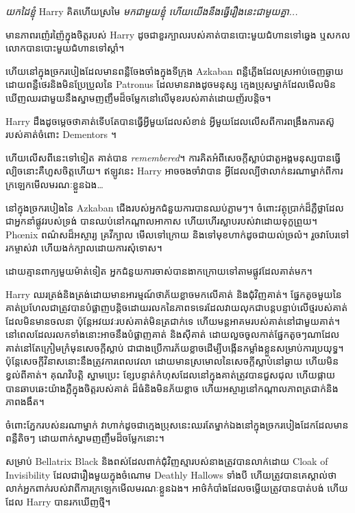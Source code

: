 {{\emph{យកដៃខ្ញុំ} Harry គិតហើយស្រមៃ \emph{មកជាមួយខ្ញុំ ហើយយើងនឹងធ្វើរឿងនេះជាមួយគ្នា...}

មាន​ភាព​រញ៉េរញ៉ៃ​ក្នុង​ចិត្ត​របស់ Harry ដូចជា​ខួរក្បាល​របស់​គាត់​បាន​បោះ​មួយ​ជំហាន​ទៅ​ឆ្វេង ឬ​សកលលោក​បាន​បោះ​មួយ​ជំហាន​ទៅ​ស្តាំ។

ហើយនៅក្នុងច្រករបៀងដែលមានពន្លឺចែងចាំងក្នុងទីក្រុង Azkaban ពន្លឺភ្លើងដែលស្រអាប់ចេញឆ្ងាយដោយពន្លឺថេរនិងមិនប្រែប្រួលនៃ Patronus ដែលមានរាងដូចមនុស្ស ក្មេងប្រុសម្នាក់ដែលមើលមិនឃើញឈរជាមួយនឹងស្នាមញញឹមដ៏ចម្លែកនៅលើមុខរបស់គាត់ដោយញ័របន្តិច។

Harry ដឹងដូចម្ដេចថាគាត់ទើបតែបានធ្វើអ្វីមួយដែលសំខាន់ អ្វីមួយដែលលើសពីការពង្រឹងការតស៊ូរបស់គាត់ចំពោះ Dementors ។

ហើយលើសពីនេះទៅទៀត គាត់បាន \emph{remembered}។ ការ​គិត​អំពី​សេចក្តី​ស្លាប់​ជា​តួ​អង្គ​មនុស្ស​បាន​ធ្វើ​ល្បិច​នោះ​គឺ​ហួស​ចិត្ត​ហើយ។ ឥឡូវនេះ Harry អាចចងចាំវាបាន អ្វីដែលល្បីថាលាក់នរណាម្នាក់ពីការក្រឡេកមើលមរណៈខ្លួនឯង…

\later

នៅក្នុងច្រករបៀងនៃ Azkaban ជើងរបស់អ្នកជំនួយការបានឈប់ភ្លាមៗ។ ចំពោះ​វត្ថុ​ប្រាក់​ដ៏​ភ្លឺ​ថ្លា​ដែល​ជា​អ្នក​នាំ​ផ្លូវ​របស់​ទ្រង់ បាន​ឈប់​នៅ​កណ្តាល​អាកាស ហើយ​ហើរ​ស្លាប​របស់​វា​ដោយ​ទុក្ខ​ព្រួយ។ Phœnix ពណ៌សដ៏អស្ចារ្យ គ្រវីក្បាល មើលទៅក្រោយ និងទៅមុខហាក់ដូចជាយល់ច្រលំ។ រួច​វា​បែរ​ទៅ​រក​ម្ចាស់​វា ហើយ​ងក់​ក្បាល​ដោយ​ការ​សុំទោស។

ដោយ​គ្មាន​ពាក្យ​មួយ​ម៉ាត់​ទៀត អ្នក​ជំនួយ​ការ​ចាស់​បាន​ងាក​ក្រោយ​ទៅ​តាម​ផ្លូវ​ដែល​គាត់​មក។

\later

Harry ឈរ​ត្រង់​និង​ត្រង់​ដោយ​មាន​អារម្មណ៍​ថា​ភ័យ​ខ្លាច​មក​លើ​គាត់ និង​ជុំវិញ​គាត់។ ផ្នែកតូចមួយនៃគាត់ប្រហែលជាត្រូវបានបំផ្លាញបន្តិចដោយរលកនៃភាពទទេរដែលវាយលុកជាបន្តបន្ទាប់លើថ្មរបស់គាត់ដែលមិនមានចលនា ប៉ុន្តែអវយវៈរបស់គាត់មិនត្រជាក់ទេ ហើយមន្តអាគមរបស់គាត់នៅជាមួយគាត់។ នៅ​ពេល​ដែល​រលក​ទាំង​នោះ​អាច​នឹង​បំផ្លាញ​គាត់ និង​ស៊ី​គាត់ ដោយ​លួច​ចូល​កាត់​ផ្នែក​តូច​ៗ​ណា​ដែល​គាត់​នៅ​តែ​ក្រៀម​ក្រំ​មុន​សេចក្ដី​ស្លាប់ ជា​ជាង​ប្រើ​ការ​ភ័យ​ខ្លាច​ដើម្បី​បង្កើន​កម្លាំង​ខ្លួន​សម្រាប់​ការ​ប្រយុទ្ធ។ ប៉ុន្តែ​សេចក្តី​វិនាស​នោះ​នឹង​ត្រូវ​ការ​ពេល​វេលា ដោយ​មាន​ស្រមោល​នៃ​សេចក្ដី​ស្លាប់​នៅ​ឆ្ងាយ ហើយ​មិន​ខ្វល់​ពី​គាត់។ គុណវិបត្តិ ស្នាមប្រេះ ខ្សែបន្ទាត់កំហុសដែលនៅក្នុងគាត់ត្រូវបានជួសជុល ហើយផ្កាយបានឆាបឆេះយ៉ាងភ្លឺក្នុងចិត្តរបស់គាត់ ដ៏ធំនិងមិនភ័យខ្លាច ហើយអស្ចារ្យនៅកណ្តាលភាពត្រជាក់និងភាពងងឹត។

ចំពោះភ្នែករបស់នរណាម្នាក់ វាហាក់ដូចជាក្មេងប្រុសនេះឈរតែម្នាក់ឯងនៅក្នុងច្រករបៀងដែកដែលមានពន្លឺតិចៗ ដោយពាក់ស្នាមញញឹមដ៏ចម្លែកនោះ។

សម្រាប់ Bellatrix Black និងពស់ដែលពាក់ជុំវិញស្មារបស់នាងត្រូវបានលាក់ដោយ Cloak of Invisibility ដែលជារឿងមួយក្នុងចំណោម Deathly Hallows ទាំងបី ហើយត្រូវបានគេស្គាល់ថាលាក់អ្នកពាក់របស់វាពីការក្រឡេកមើលមរណៈខ្លួនឯង។ អាថ៌កំបាំងដែលចម្លើយត្រូវបានបាត់បង់ ហើយដែល Harry បានរកឃើញថ្មី។

}}
